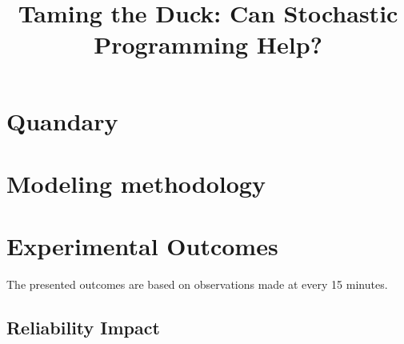 

\usepackage{natbib}			%
\setlength{\bibsep}{0pt}

\setlength{\textheight}{23cm} %
\setlength{\topmargin}{-2cm}
\setlength{\textwidth}{17.5cm} \setlength{\oddsidemargin}{-0.5cm}
\setlength{\evensidemargin}{-0.5cm}

\setlength{\parindent}{0pt}

\newcommand{\gap}{\vspace{5pt}}
\newcommand{\epc}{\hspace{1pc}}

\newcommand{\onebld}{{\bf 1}}
\newcommand{\wt}{\widetilde}
\newcommand{\wh}{\widehat}

\usepackage{moreverb} %
\immediate{}
\newcommand\wordcount{
}

\immediate{}
\newcommand\charcount{
}

\newcommand{\E}{{\rm I\!E}}
\newcommand{\IP}{{\rm I\!P}}
\newcommand{\D}{{\rm I\!D}}
\newcommand{\pmat}[1]{\begin{pmatrix} #1 \end{pmatrix}}
\newcommand{\us}[1]{{\color{black}#1}}
\newcommand{\ssbs}[1]{{\color{blue}#1}}


\title{\bf Taming the Duck: Can Stochastic Programming Help?}


\maketitle

\section{Quandary}
\section{Modeling methodology}
\section{Experimental Outcomes}

The presented outcomes are based on observations made at every 15 minutes.

\subsection{Reliability Impact}

